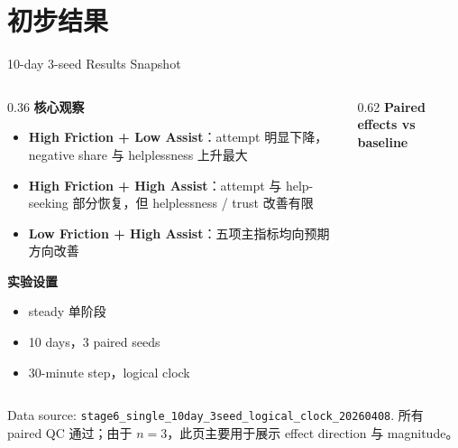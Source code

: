 \documentclass[aspectratio=169]{beamer}
\begin{document}
\section{初步结果}

\begin{frame}[t]{10-day 3-seed Results Snapshot}
\footnotesize
\begin{columns}[T]
\begin{column}{0.36\textwidth}
\textbf{核心观察}
\begin{itemize}
    \item \textbf{High Friction + Low Assist}：attempt 明显下降，negative share 与 helplessness 上升最大
    \item \textbf{High Friction + High Assist}：attempt 与 help-seeking 部分恢复，但 helplessness / trust 改善有限
    \item \textbf{Low Friction + High Assist}：五项主指标均向预期方向改善
\end{itemize}

\textbf{实验设置}
\begin{itemize}
    \item steady 单阶段
    \item 10 days，3 paired seeds
    \item 30-minute step，logical clock
\end{itemize}
\end{column}

\begin{column}{0.62\textwidth}
\scriptsize
\centering
\textbf{Paired effects vs baseline}\\[2pt]
\end{column}
\end{columns}

{\tiny Data source: \texttt{stage6\_single\_10day\_3seed\_logical\_clock\_20260408}. 所有 paired QC 通过；由于 $n{=}3$，此页主要用于展示 effect direction 与 magnitude。}
\end{frame}
\end{document}
